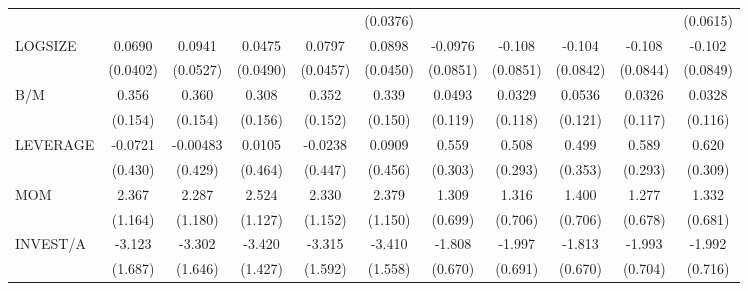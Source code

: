\begin{table}[htbp]
\begin{tabular}{l*{10}{c}}
                &                  &                  &                  &                  & (0.0376)         &                  &                  &                  &                  & (0.0615)         \\
LOGSIZE         &   0.0690\sym{*}  &   0.0941\sym{*}  &   0.0475         &   0.0797\sym{*}  &   0.0898\sym{*}  &  -0.0976         &   -0.108         &   -0.104         &   -0.108         &   -0.102         \\
                & (0.0402)         & (0.0527)         & (0.0490)         & (0.0457)         & (0.0450)         & (0.0851)         & (0.0851)         & (0.0842)         & (0.0844)         & (0.0849)         \\
B/M             &    0.356\sym{**} &    0.360\sym{**} &    0.308\sym{*}  &    0.352\sym{**} &    0.339\sym{**} &   0.0493         &   0.0329         &   0.0536         &   0.0326         &   0.0328         \\
                &  (0.154)         &  (0.154)         &  (0.156)         &  (0.152)         &  (0.150)         &  (0.119)         &  (0.118)         &  (0.121)         &  (0.117)         &  (0.116)         \\
LEVERAGE        &  -0.0721         & -0.00483         &   0.0105         &  -0.0238         &   0.0909         &    0.559\sym{*}  &    0.508\sym{*}  &    0.499         &    0.589\sym{**} &    0.620\sym{**} \\
                &  (0.430)         &  (0.429)         &  (0.464)         &  (0.447)         &  (0.456)         &  (0.303)         &  (0.293)         &  (0.353)         &  (0.293)         &  (0.309)         \\
MOM             &    2.367\sym{**} &    2.287\sym{*}  &    2.524\sym{**} &    2.330\sym{**} &    2.379\sym{**} &    1.309\sym{*}  &    1.316\sym{*}  &    1.400\sym{*}  &    1.277\sym{*}  &    1.332\sym{*}  \\
                &  (1.164)         &  (1.180)         &  (1.127)         &  (1.152)         &  (1.150)         &  (0.699)         &  (0.706)         &  (0.706)         &  (0.678)         &  (0.681)         \\
INVEST/A        &   -3.123\sym{*}  &   -3.302\sym{**} &   -3.420\sym{**} &   -3.315\sym{**} &   -3.410\sym{**} &   -1.808\sym{***}&   -1.997\sym{***}&   -1.813\sym{***}&   -1.993\sym{***}&   -1.992\sym{***}\\
                &  (1.687)         &  (1.646)         &  (1.427)         &  (1.592)         &  (1.558)         &  (0.670)         &  (0.691)         &  (0.670)         &  (0.704)         &  (0.716)         \\

\end{tabular}
\end{table}
